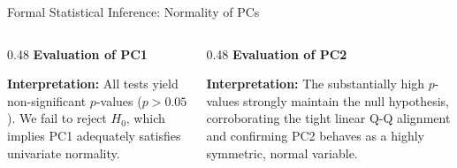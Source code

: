 \documentclass[8pt, aspectratio=169]{beamer}
\begin{document}
\begin{frame}{Formal Statistical Inference: Normality of PCs}
    \begin{columns}[T]
        \begin{column}{0.48\textwidth}
            \centering
            \textbf{Evaluation of PC1}
            \vspace{0.1cm}
            \begin{table}
            \end{table}
            \vspace{0.1cm}
            \justifying
            \scriptsize{\textbf{Interpretation:} All tests yield non-significant $p$-values ($p > 0.05$). We fail to reject $H_0$, which implies PC1 adequately satisfies univariate normality.}
        \end{column}
        
        \begin{column}{0.48\textwidth}
            \centering
            \textbf{Evaluation of PC2}
            \vspace{0.1cm}
            \begin{table}
            \end{table}
            \vspace{0.1cm}
            \justifying
            \scriptsize{\textbf{Interpretation:} The substantially high $p$-values strongly maintain the null hypothesis, corroborating the tight linear Q-Q alignment and confirming PC2 behaves as a highly symmetric, normal variable.}
        \end{column}
    \end{columns}


\end{frame}
\end{document}
